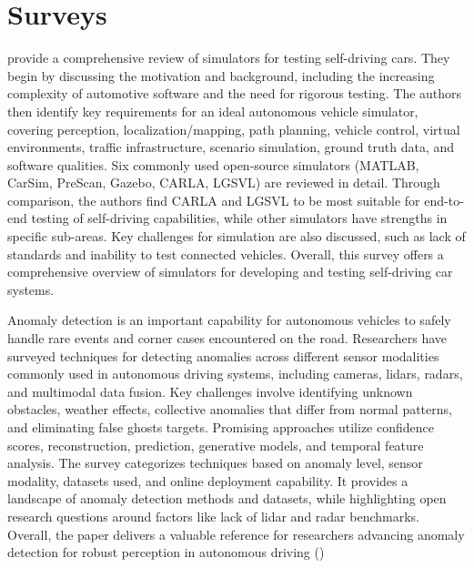 \section{Surveys}


\cite{kaur2021survey} provide a comprehensive review of simulators for testing self-driving cars. They begin by discussing the motivation and background, including the increasing complexity of automotive software and the need for rigorous testing. The authors then identify key requirements for an ideal autonomous vehicle simulator, covering perception, localization/mapping, path planning, vehicle control, virtual environments, traffic infrastructure, scenario simulation, ground truth data, and software qualities. Six commonly used open-source simulators (MATLAB, CarSim, PreScan, Gazebo, CARLA, LGSVL) are reviewed in detail. Through comparison, the authors find CARLA and LGSVL to be most suitable for end-to-end testing of self-driving capabilities, while other simulators have strengths in specific sub-areas. Key challenges for simulation are also discussed, such as lack of standards and inability to test connected vehicles. Overall, this survey offers a comprehensive overview of simulators for developing and testing self-driving car systems.


Anomaly detection is an important capability for autonomous vehicles to safely handle rare events and corner cases encountered on the road. Researchers have surveyed techniques for detecting anomalies across different sensor modalities commonly used in autonomous driving systems, including cameras, lidars, radars, and multimodal data fusion. Key challenges involve identifying unknown obstacles, weather effects, collective anomalies that differ from normal patterns, and eliminating false ghosts targets. Promising approaches utilize confidence scores, reconstruction, prediction, generative models, and temporal feature analysis. The survey categorizes techniques based on anomaly level, sensor modality, datasets used, and online deployment capability. It provides a landscape of anomaly detection methods and datasets, while highlighting open research questions around factors like lack of lidar and radar benchmarks. Overall, the paper delivers a valuable reference for researchers advancing anomaly detection for robust perception in autonomous driving (\cite{bogdoll2022anomaly})




